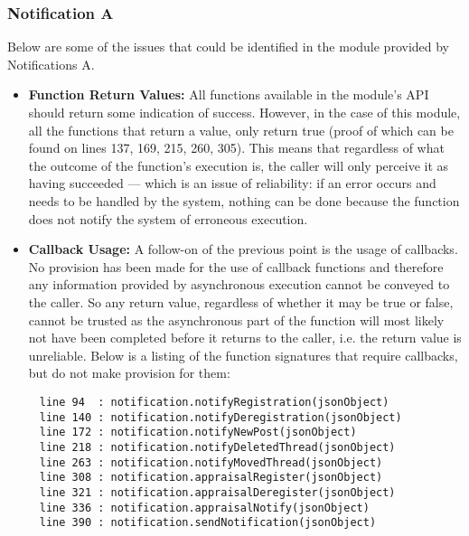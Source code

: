 
\subsubsection*{Notification A}
Below are some of the issues that could be identified in the module provided by Notifications A.
\begin{itemize}
    \item \textbf{Function Return Values:}\newline
     All functions available in the module's API should return some indication of success.
     However, in the case of this module, all the functions that return a value, only return true (proof of which can be found on lines 137, 169, 215, 260, 305). This means that 
     regardless of what the outcome of the function's execution is, the caller will only perceive it as 
     having succeeded --- which is an issue of reliability: if an error occurs and needs to be handled by the system, 
     nothing can be done because the function does not notify the system of erroneous execution.
     \item \textbf{Callback Usage:}\newline
     A follow-on of the previous point is the usage of callbacks.
     No provision has been made for the use of callback functions and therefore any 
     information provided by asynchronous execution cannot be conveyed to the caller. So any return value, regardless of whether it may be true or false, cannot be trusted as the asynchronous part of the function will most likely not have been completed before it returns to the caller, i.e. the return value is unreliable.\newline
     Below is a listing of the function signatures that require callbacks, but do not make provision for them:
\end{itemize}
\begin{lstlisting}
     line 94  : notification.notifyRegistration(jsonObject)
     line 140 : notification.notifyDeregistration(jsonObject)
     line 172 : notification.notifyNewPost(jsonObject)
     line 218 : notification.notifyDeletedThread(jsonObject)
     line 263 : notification.notifyMovedThread(jsonObject)
     line 308 : notification.appraisalRegister(jsonObject)
     line 321 : notification.appraisalDeregister(jsonObject)
     line 336 : notification.appraisalNotify(jsonObject)
     line 390 : notification.sendNotification(jsonObject)
\end{lstlisting}
   
